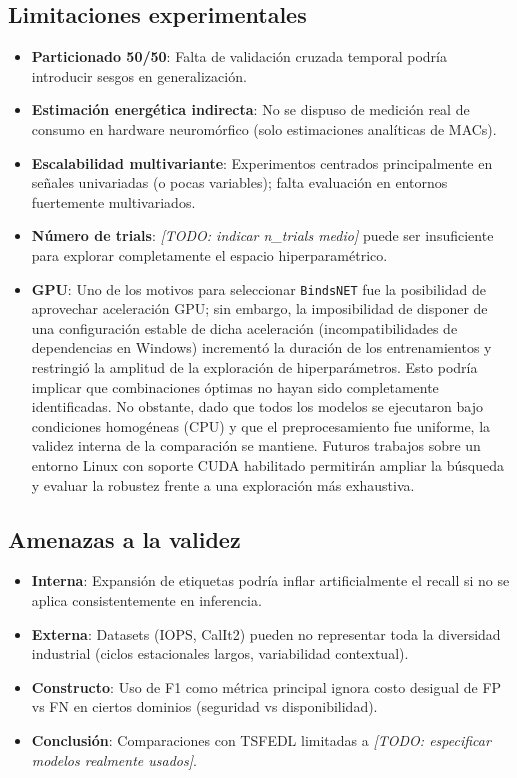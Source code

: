 \subsection{Limitaciones experimentales}
\begin{itemize}
    \item \textbf{Particionado 50/50}: Falta de validación cruzada temporal podría introducir sesgos en generalización.
    \item \textbf{Estimación energética indirecta}: No se dispuso de medición real de consumo en hardware neuromórfico (solo estimaciones analíticas de MACs).
    \item \textbf{Escalabilidad multivariante}: Experimentos centrados principalmente en señales univariadas (o pocas variables); falta evaluación en entornos fuertemente multivariados.
    \item \textbf{Número de trials}: \textit{[TODO: indicar n\_trials medio]} puede ser insuficiente para explorar completamente el espacio hiperparamétrico.
    \item \textbf{GPU}: Uno de los motivos para seleccionar \texttt{BindsNET} fue la posibilidad de aprovechar aceleración GPU; sin embargo, la imposibilidad de disponer de una configuración estable de dicha aceleración (incompatibilidades de dependencias en Windows) incrementó la duración de los entrenamientos y restringió la amplitud de la exploración de hiperparámetros. Esto podría implicar que combinaciones óptimas no hayan sido completamente identificadas. No obstante, dado que todos los modelos se ejecutaron bajo condiciones homogéneas (CPU) y que el preprocesamiento fue uniforme, la validez interna de la comparación se mantiene. Futuros trabajos sobre un entorno Linux con soporte CUDA habilitado permitirán ampliar la búsqueda y evaluar la robustez frente a una exploración más exhaustiva.
\end{itemize}

\subsection{Amenazas a la validez}
\begin{itemize}
    \item \textbf{Interna}: Expansión de etiquetas podría inflar artificialmente el recall si no se aplica consistentemente en inferencia.
    \item \textbf{Externa}: Datasets (IOPS, CalIt2) pueden no representar toda la diversidad industrial (ciclos estacionales largos, variabilidad contextual).
    \item \textbf{Constructo}: Uso de F1 como métrica principal ignora costo desigual de FP vs FN en ciertos dominios (seguridad vs disponibilidad).
    \item \textbf{Conclusión}: Comparaciones con TSFEDL limitadas a \textit{[TODO: especificar modelos realmente usados]}.
\end{itemize}

